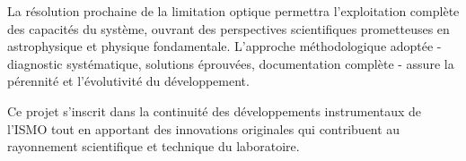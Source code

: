 La résolution prochaine de la limitation optique permettra l'exploitation complète des capacités du système, ouvrant des perspectives scientifiques prometteuses en astrophysique et physique fondamentale. L'approche méthodologique adoptée - diagnostic systématique, solutions éprouvées, documentation complète - assure la pérennité et l'évolutivité du développement.

Ce projet s'inscrit dans la continuité des développements instrumentaux de l'ISMO tout en apportant des innovations originales qui contribuent au rayonnement scientifique et technique du laboratoire.